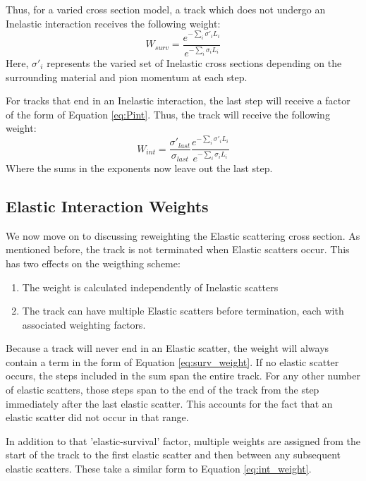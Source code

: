 \documentclass[12pt]{article}
\begin{document}
Thus, for a varied cross section model, a track which does not undergo an Inelastic interaction receives the following weight:
\begin{equation}\label{eq:surv_weight}
  W_{surv} = \frac{e^{- \sum \limits_{i} \sigma'_i L_i}}{e^{- \sum \limits_{i} \sigma_i L_i}}
\end{equation}
Here, $\sigma'_i$ represents the varied set of Inelastic cross sections depending on the surrounding material and pion momentum at each step.

For tracks that end in an Inelastic interaction, the last step will receive a factor of the form of Equation \ref{eq:Pint}. Thus, the track will receive the following weight: 
\begin{equation}\label{eq:int_weight}
  W_{int} = \frac{\sigma'_{last}}{\sigma_{last}} \frac{e^{- \sum \limits_{i} \sigma'_i L_i}}{e^{- \sum \limits_{i} \sigma_i L_i}}
\end{equation}
Where the sums in the exponents now leave out the last step.

\subsection{Elastic Interaction Weights}
We now move on to discussing reweighting the Elastic scattering cross section. As mentioned before, the track is not terminated when Elastic scatters occur. This has two effects on the weigthing scheme:
\begin{enumerate}
\item The weight is calculated independently of Inelastic scatters
\item The track can have multiple Elastic scatters before termination, each with associated weighting factors. 
\end{enumerate}

Because a track will never end in an Elastic scatter, the weight will always contain a term in the form of Equation \ref{eq:surv_weight}. If no elastic scatter occurs, the steps included in the sum span the entire track. For any other number of elastic scatters, those steps span to the end of the track from the step immediately after the last elastic scatter. This accounts for the fact that an elastic scatter did not occur in that range. 

In addition to that 'elastic-survival' factor, multiple weights are assigned from the start of the track to the first elastic scatter and then between any subsequent elastic scatters. These take a similar form to Equation \ref{eq:int_weight}.
\end{document}
